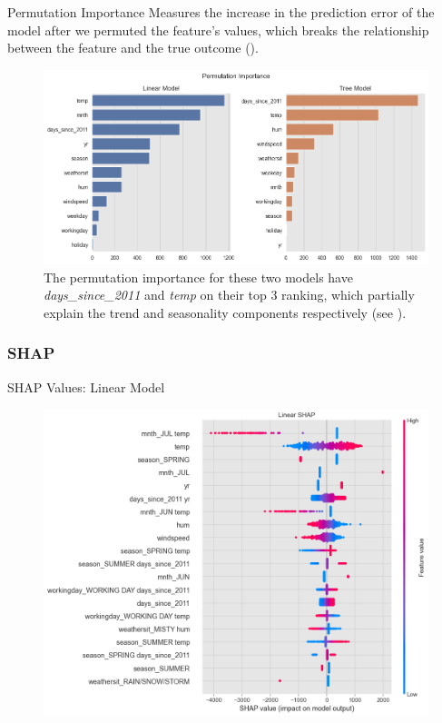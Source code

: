 \documentclass[10pt]{beamer}
\begin{document}
\begin{frame}{Permutation Importance}
Measures the increase in the prediction error of the model after we permuted the feature's values, which breaks the relationship between the feature and the true outcome (\cite[Section 5.5]{molnar2019}).
\begin{center}
  \begin{figure}
    \includegraphics[scale=0.35]{images/interpretable_ml_104_0.png}
    \caption{The permutation importance for these two models have {\em days\_since\_2011} and {\em temp} on their top 3 ranking, which partially explain the trend and seasonality components respectively (see \cite[Figure 5.30]{molnar2019}).}
  \end{figure}
\end{center}
\end{frame}

\subsubsection{SHAP}

\begin{frame}{SHAP Values: Linear Model}
\begin{center}
  \begin{figure}
    \includegraphics[scale=0.35]{images/interpretable_ml_114_0.png}
  \end{figure}
\end{center}
\end{frame}
\end{document}
